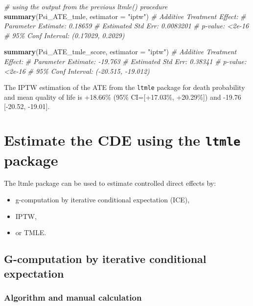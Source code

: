 \documentclass[
]{book}
\newenvironment{Shaded}{\begin{snugshade}}{\end{snugshade}}
\newcommand{\AttributeTok}[1]{\textcolor[rgb]{0.13,0.29,0.53}{#1}}
\newcommand{\CommentTok}[1]{\textcolor[rgb]{0.56,0.35,0.01}{\textit{#1}}}
\newcommand{\FunctionTok}[1]{\textcolor[rgb]{0.13,0.29,0.53}{\textbf{#1}}}
\newcommand{\NormalTok}[1]{#1}
\newcommand{\StringTok}[1]{\textcolor[rgb]{0.31,0.60,0.02}{#1}}
\providecommand{\tightlist}{%
  \setlength{\itemsep}{0pt}\setlength{\parskip}{0pt}}
\begin{document}
\begin{Shaded}
\begin{Highlighting}[]
\CommentTok{\# using the output from the previous ltmle() procedure}
\FunctionTok{summary}\NormalTok{(Psi\_ATE\_tmle, }\AttributeTok{estimator =} \StringTok{"iptw"}\NormalTok{)}
\CommentTok{\# Additive Treatment Effect:}
\CommentTok{\#    Parameter Estimate:  0.18659 }
\CommentTok{\#     Estimated Std Err:  0.0083201 }
\CommentTok{\#               p{-}value:  \textless{}2e{-}16 }
\CommentTok{\#     95\% Conf Interval: (0.17029, 0.2029) }

\FunctionTok{summary}\NormalTok{(Psi\_ATE\_tmle\_score, }\AttributeTok{estimator =} \StringTok{"iptw"}\NormalTok{)}
\CommentTok{\# Additive Treatment Effect:}
\CommentTok{\#    Parameter Estimate:  {-}19.763 }
\CommentTok{\#     Estimated Std Err:  0.38341 }
\CommentTok{\#               p{-}value:  \textless{}2e{-}16 }
\CommentTok{\#     95\% Conf Interval: ({-}20.515, {-}19.012) }
\end{Highlighting}
\end{Shaded}

The IPTW estimation of the ATE from the \texttt{ltmle} package for death probability and mean quality of life is +18.66\% (95\% CI={[}+17.03\%, +20.29\%{]}) and -19.76 {[}-20.52, -19.01{]}.

\chapter{\texorpdfstring{Estimate the CDE using the \texttt{ltmle} package}{Estimate the CDE using the ltmle package}}\label{estimate-the-cde-using-the-ltmle-package}

The ltmle package can be used to estimate controlled direct effects by:

\begin{itemize}
\tightlist
\item
  g-computation by iterative conditional expectation (ICE),
\item
  IPTW,
\item
  or TMLE.
\end{itemize}

\section{G-computation by iterative conditional expectation}\label{ChapGcomp-CDE-ICE}

\subsection{Algorithm and manual calculation}\label{algorithm-and-manual-calculation}
\end{document}
